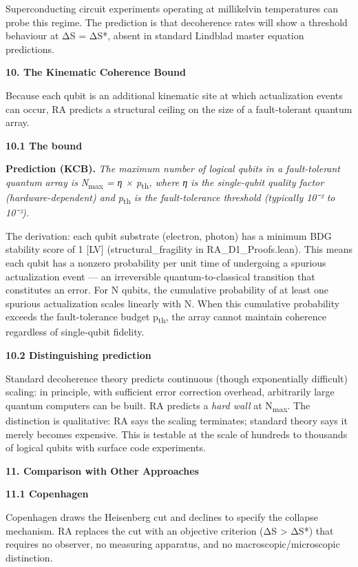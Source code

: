 \documentclass[12pt,a4paper]{article}
\begin{document}
Superconducting circuit experiments operating at millikelvin
temperatures can probe this regime. The prediction is that decoherence
rates will show a threshold behaviour at ΔS = ΔS*, absent in standard
Lindblad master equation predictions.

\textbf{10. The Kinematic Coherence Bound}

Because each qubit is an additional kinematic site at which
actualization events can occur, RA predicts a structural ceiling on the
size of a fault-tolerant quantum array.

\textbf{10.1 The bound}

\textbf{Prediction (KCB).} \emph{The maximum number of logical qubits in
a fault-tolerant quantum array is N}\textsubscript{max} \emph{= η ×
p}\textsubscript{th}\emph{, where η is the single-qubit quality factor
(hardware-dependent) and p}\textsubscript{th} \emph{is the
fault-tolerance threshold (typically 10⁻² to 10⁻³).}

The derivation: each qubit substrate (electron, photon) has a minimum
BDG stability score of 1 {[}LV{]} (structural\_fragility in
RA\_D1\_Proofs.lean). This means each qubit has a nonzero probability
per unit time of undergoing a spurious actualization event --- an
irreversible quantum-to-classical transition that constitutes an error.
For N qubits, the cumulative probability of at least one spurious
actualization scales linearly with N. When this cumulative probability
exceeds the fault-tolerance budget p\textsubscript{th}, the array cannot
maintain coherence regardless of single-qubit fidelity.

\textbf{10.2 Distinguishing prediction}

Standard decoherence theory predicts continuous (though exponentially
difficult) scaling: in principle, with sufficient error correction
overhead, arbitrarily large quantum computers can be built. RA predicts
a \emph{hard wall} at N\textsubscript{max}. The distinction is
qualitative: RA says the scaling terminates; standard theory says it
merely becomes expensive. This is testable at the scale of hundreds to
thousands of logical qubits with surface code experiments.

\textbf{11. Comparison with Other Approaches}

\textbf{11.1 Copenhagen}

Copenhagen draws the Heisenberg cut and declines to specify the collapse
mechanism. RA replaces the cut with an objective criterion (ΔS
\textgreater{} ΔS*) that requires no observer, no measuring apparatus,
and no macroscopic/microscopic distinction.
\end{document}
